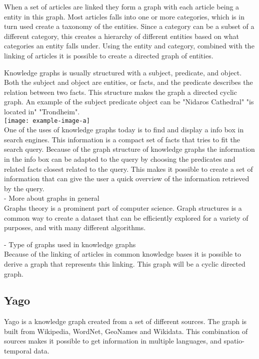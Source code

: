 When a set of articles are linked they form a graph with each article being a entity in this graph\cite{mahdisoltani:hal-01699874, hoffart2013yago2}. Most articles falls into one or more categories, which is in turn used create a taxonomy of the entities. Since a category can be a subset of a different category, this creates a hierarchy of different entities based on what categories an entity falls under. Using the entity and category, combined with the linking of articles it is possible to create a directed graph of entities.

Knowledge graphs is usually structured with a subject, predicate, and object. Both the subject and object are entities, or facts, and the predicate describes the relation between two facts. This structure makes the graph a directed cyclic graph. An example of the subject predicate object can be "Nidaros Cathedral" "is located in" "Trondheim".\\
\texttt{[image: example-image-a]}\\

One of the uses of knowledge graphs today is to find and display a info box in search engines. This information is a compact set of facts that tries to fit the search query. Because of the graph structure of knowledge graphs the information in the info box can be adapted to the query by choosing the predicates and related facts closest related to the query. This makes it possible to create a set of information that can give the user a quick overview of the information retrieved by the query.\\

- More about graphs in general\\
Graphs theory is a prominent part of computer science. Graph structures is a common way to create a dataset that can be efficiently explored for a variety of purposes, and with many different algorithms. 

- Type of graphs used in knowledge graphs\\
Because of the linking of articles in common knowledge bases it is possible to derive a graph that represents this linking. This graph will be a cyclic directed graph.


\subsection{Yago}
Yago\cite{yago} is a knowledge graph created from a set of different sources. The graph is built from Wikipedia, WordNet, GeoNames and Wikidata. This combination of sources makes it possible to get information in multiple languages, and spatio-temporal data.

